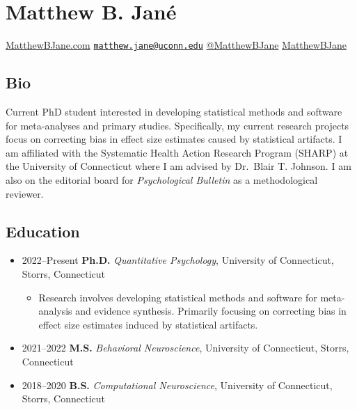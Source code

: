 \documentclass[
  letterpaper,
  DIV=11,
  numbers=noendperiod]{scrartcl}
\author{}
\date{}
\providecommand{\tightlist}{%
  \setlength{\itemsep}{0pt}\setlength{\parskip}{0pt}}\usepackage{longtable,booktabs,array}
\begin{document}
\section{Matthew B. Jané}\label{matthew-b.-januxe9}

 \href{https://www.matthewbjane.com}{MatthewBJane.com}
\textbar{} 
\href{mailto:matthew.jane@uconn.edu}{\nolinkurl{matthew.jane@uconn.edu}}
\textbar{} 
\href{https://www.twitter.com/MatthewBJane}{@MatthewBJane} \textbar{}
 \href{https://www.github.io/MatthewBJane}{MatthewBJane}

\subsection{\texorpdfstring{ Bio}{ Bio}}\label{bio}

Current PhD student interested in developing statistical methods and
software for meta-analyses and primary studies. Specifically, my current
research projects focus on correcting bias in effect size estimates
caused by statistical artifacts. I am affiliated with the Systematic
Health Action Research Program (SHARP) at the University of Connecticut
where I am advised by Dr.~Blair T. Johnson. I am also on the editorial
board for \emph{Psychological Bulletin} as a methodological reviewer.

\subsection{\texorpdfstring{ Education}{ Education}}\label{education}

\begin{itemize}
\item
  2022--Present \textbar{} \textbf{Ph.D.} \emph{Quantitative
  Psychology}, University of Connecticut, Storrs, Connecticut

  \begin{itemize}
  \tightlist
  \item
    Research involves developing statistical methods and software for
    meta-analysis and evidence synthesis. Primarily focusing on
    correcting bias in effect size estimates induced by statistical
    artifacts.
  \end{itemize}
\item
  2021--2022 \textbar{} \textbf{M.S.} \emph{Behavioral Neuroscience},
  University of Connecticut, Storrs, Connecticut
\item
  2018--2020 \textbar{} \textbf{B.S.} \emph{Computational Neuroscience},
  University of Connecticut, Storrs, Connecticut
\end{itemize}
\end{document}
